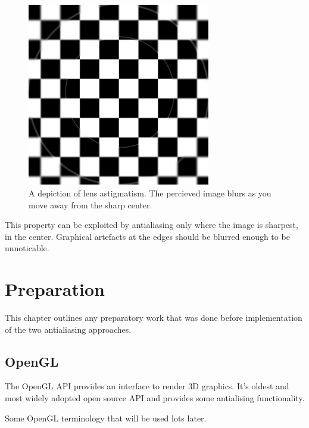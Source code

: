 \documentclass[12pt,a4paper,twoside,openright]{report}
\begin{document}
\begin{figure}
\centerline{\includegraphics[width=8cm]{figs/blur.png}}
\caption{A depiction of lens astigmatism. The percieved image blurs as you move away from the sharp center.}
\label{blurred}
\end{figure}

This property can be exploited by antialiasing only where the image is sharpest, in the center. Graphical artefacts at the edges should be blurred enough to be unnoticable.



\chapter{Preparation}

This chapter outlines any preparatory work that was done before implementation of the two antialiasing approaches.

\section{OpenGL}

The OpenGL API provides an interface to render 3D graphics. It's oldest and most widely adopted open source API and provides some antialising functionality.

Some OpenGL terminology that will be used lots later.
\end{document}
